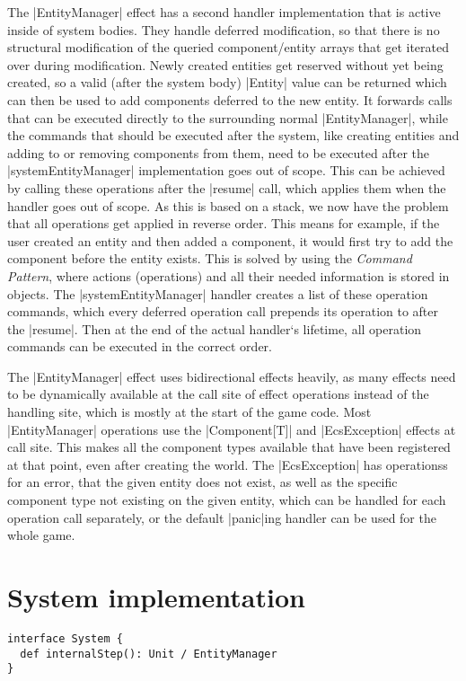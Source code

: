 The |EntityManager| effect has a second handler implementation that is active inside of system bodies. They handle deferred modification, so that there is no structural modification of the queried component/entity arrays that get iterated over during modification. Newly created entities get reserved without yet being created, so a valid (after the system body) |Entity| value can be returned which can then be used to add components deferred to the new entity. It forwards calls that can be executed directly to the surrounding normal |EntityManager|, while the commands that should be executed after the system, like creating entities and adding to or removing components from them, need to be executed after the |systemEntityManager| implementation goes out of scope. This can be achieved by calling these operations after the |resume| call, which applies them when the handler goes out of scope. As this is based on a stack, we now have the problem that all operations get applied in reverse order. This means for example, if the user created an entity and then added a component, it would first try to add the component before the entity exists. This is solved by using the \textit{Command Pattern}, where actions (operations) and all their needed information is stored in objects. The |systemEntityManager| handler creates a list of these operation commands, which every deferred operation call prepends its operation to after the |resume|. Then at the end of the actual handler`s lifetime, all operation commands can be executed in the correct order.

The |EntityManager| effect uses bidirectional effects heavily, as many effects need to be dynamically available at the call site of effect operations instead of the handling site, which is mostly at the start of the game code. Most |EntityManager| operations use the |Component[T]| and |EcsException| effects at call site. This makes all the component types available that have been registered at that point, even after creating the world. The |EcsException| has operationss for an error, that the given entity does not exist, as well as the specific component type not existing on the given entity, which can be handled for each operation call separately, or the default |panic|ing handler can be used for the whole game.

\section{System implementation}

\begin{lstlisting}[caption=System signiture]
interface System {
  def internalStep(): Unit / EntityManager
}
\end{lstlisting}

